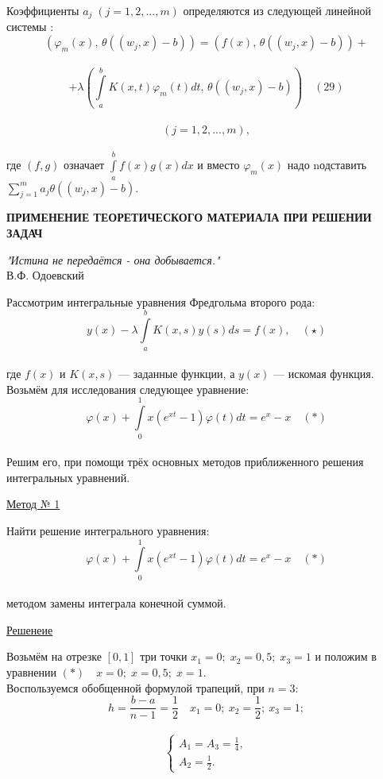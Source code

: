 \documentclass[12pt]{article}
\begin{document}
Коэффициенты $ a_j \; (j = 1,2 , ..., m ) $ определяются из следующей линейной системы :\\
$$ (\varphi_m(x),\, \theta(( w_j,x) -b)) = (f(x), \, \theta(( w_j,x) -b)) +$$ \\
 $$ +\lambda\left( \int\limits_a^b K(x,t)\varphi_m(t)dt, \, \theta(( w_j,x) -b) \right) \quad (29)$$\\
$$ (j = 1, 2, ..., m), $$\\
где $ (f,g) $ означает $ \int\limits_a^b f(x)g(x)dx $ и вместо $ \varphi_m(x) $ надо nодставить $ \sum\limits_{j=1}^m a_j\theta(( w_j,x) -b) $.
\newpage 
\begin{center}
	\textbf{ПРИМЕНЕНИЕ ТЕОРЕТИЧЕСКОГО МАТЕРИАЛА ПРИ РЕШЕНИИ ЗАДАЧ}\\
\end{center}
\begin{flushright}
	\textit{	"Истина не передаётся - она добывается."\\}
	В.Ф. Одоевский
\end{flushright}

Рассмотрим интегральные уравнения Фредгольма второго рода:
$$ y(x) - \lambda \int\limits_a^b K(x, s) y(s) ds = f(x), \quad (\star) $$ \\
где $ f(x) $ и $ K(x, s) $ — заданные функции, а $ y(x) $ — искомая функция.\\

Возьмём для исследования следующее уравнение:\\
$$ \varphi(x) + \int\limits_0^1 x(e^{xt}-1)\varphi(t) dt = e^{x} - x  \quad  (\ast)$$\\

Решим его, при помощи трёх основных методов приближенного решения интегральных уравнений.
\\
\newpage
\begin{center}
	\underline{Метод № 1}\\
	\begin{center}
		Найти решение интегрального уравнения:\\
		$$ \varphi(x) + \int\limits_0^1 x(e^{xt}-1)\varphi(t) dt = e^{x} - x  \quad  (\ast)$$\\
		методом замены интеграла конечной суммой. 	
	\end{center}	
	\underline{Решенеие}\\
\end{center}
Возьмём на отрезке $ [0, 1] $ три точки $ x_1 = 0; \; x_2 = 0,5; \; x_3 = 1  $ и положим в уравнении $ (\ast) \quad x = 0; \; x = 0,5; \; x =1 .$\\
Воспользуемся обобщенной формулой трапеций, при $ n = 3 $:
\\
$$ h = \frac{b-a}{n-1} = \frac{1}{2} \quad  x_1 = 0; \: x_2 = \frac{1}{2}; \: x_3 = 1; $$\\
\begin{equation*}
	\begin{cases}
		A_1 = A_3 = \frac{1}{4}, \\ 
		A_2 = \frac{1}{2}.
	\end{cases}
\end{equation*}\\
\end{document}

